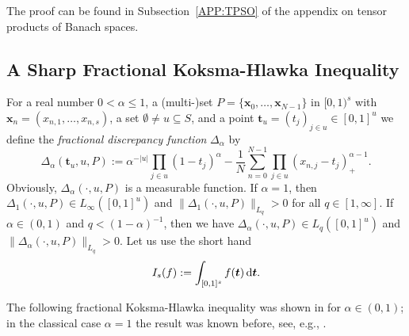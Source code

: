 \documentclass[12pt]{article}
\newcommand{\bsx}{\boldsymbol{x}}
\newcommand{\bst}{\boldsymbol{t}}
\begin{document}
The proof can be found in Subsection~\ref{APP:TPSO} of the appendix on tensor products of Banach spaces.


\subsection{A Sharp Fractional Koksma-Hlawka Inequality}
\label{Subsec:SKHI}



For a real number $0<\alpha\le 1$, a (multi-)set $P=\{\bsx_0,\ldots,
\bsx_{N-1}\}$ in $[0,1)^s$ with $\bsx_n = (x_{n,1},\ldots,x_{n,s})$,
a set $\emptyset\neq u \subseteq S$, and a point
$\bst_u = (t_j)_{j\in u}\in [0,1]^{u}$ we define the
\emph{fractional discrepancy function} $\Delta_\alpha$ by
\begin{equation*}
\Delta_\alpha(\bst_u, u, P) := \alpha^{-|u|}
\prod_{j\in u}(1-t_j)^\alpha - \frac{1}{N} \sum^{N-1}_{n=0}
\prod_{j\in u}(x_{n,j}-t_j)_+^{\alpha-1}.
\end{equation*}
Obviously, $\Delta_\alpha(\cdot, u, P)$ is a measurable function.
If $\alpha=1$, then $\Delta_1(\cdot, u, P)
\in L_\infty ([0,1]^{u})$ and
$\|\Delta_1(\cdot,u,P)\|_{L_q} >0$ for all $q\in [1,\infty]$.
If $\alpha\in (0,1)$ and $q<(1-\alpha)^{-1}$, then we have $\Delta_\alpha(\cdot, u, P)
\in L_q([0,1]^{u})$ and
$\|\Delta_\alpha(\cdot,u,P)\|_{L_q} >0$.
Let us use the short hand
\begin{equation*}
I_s(f):= \int_{[0,1]^s} f(\bst)\,{\rm d}\bst.
\end{equation*}



The following fractional Koksma-Hlawka inequality was shown in \cite{D08} for $\alpha \in (0,1)$;
in the classical case $\alpha =1$ the result was known before, see, e.g., \cite{Hic98}.
\end{document}

